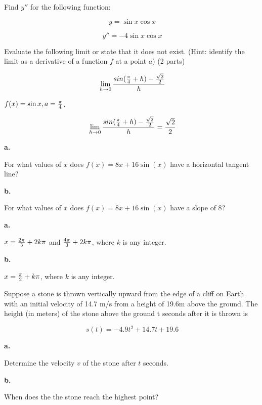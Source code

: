 Find $y''$ for the following function:

$$\
y = \sin x \cos x
$$

$$\
y'' = -4 \sin x \cos x
$$

\bigskip

Evaluate the following limit or state that it does not exist.
(Hint: identify the limit as a derivative of a function $f$
at a point $a$) (2 parts)

$$\
\lim_{h \to 0} {
{sin({\pi \over 4} + h}) - {\sqrt{2} \over 2}
\over
h
}
$$


$f(x) = \sin x, a = {\pi \over 4}$.

$$\
\lim_{h \to 0} {
{sin({\pi \over 4} + h}) - {\sqrt{2} \over 2}
\over
h
} = {\sqrt{2} \over 2}
$$

\bigskip

{\par \bf a.} For what values of $x$ does
$f(x) = 8x + 16\sin(x)$ have a horizontal tangent line?

{\par \bf b.} For what values of $x$ does $f(x) = 8x + 16\sin(x)$
have a slope of 8?


{\par \bf a.}
$x = {2\pi \over 3} + 2k\pi$ and
${4\pi \over 3} + 2k\pi$, where $k$ is any integer.

{\par \bf b.}
$x = {\pi \over 2} + k\pi$, where $k$ is any integer.

\bigskip

\problem{3.6.3}
\bigskip

\bigskip

\bigskip

\bigskip


Suppose a stone is thrown vertically upward from the edge of
a cliff on Earth with an initial velocity of 14.7 m/s from
a height of 19.6m above the ground. The height (in meters)
of the stone above the ground t seconds after it is thrown
is

$$\
s(t) = -4.9t^2 + 14.7t + 19.6
$$

{\par \bf a.} Determine the velocity $v$ of the stone after
$t$ seconds.

{\par \bf b.} When does the the stone reach the highest point?

